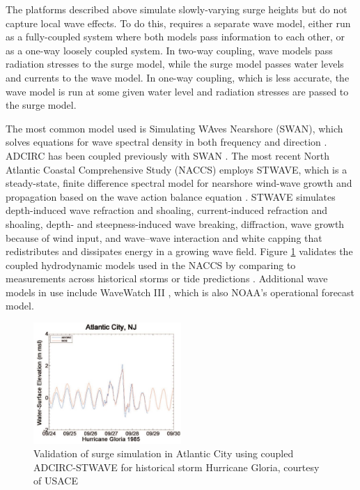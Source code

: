 The platforms described above simulate slowly-varying surge heights but do not capture local wave effects. To do this, requires a separate wave model, either run as a fully-coupled system where both models pass information to each other, or as a one-way loosely coupled system. In two-way coupling, wave models pass radiation stresses to the surge model, while the surge model passes water levels and currents to the wave model. In one-way coupling, which is less accurate, the wave model is run at some given water level and radiation stresses are passed to the surge model.

The most common model used is Simulating WAves Nearshore (SWAN), which solves equations for wave spectral density in both frequency and direction \citep{zijlema2010computation}. ADCIRC has been coupled previously with SWAN \citep{dietrich2011modeling,kennedy2012tropical}. The most recent North Atlantic Coastal Comprehensive Study (NACCS) \citep{usace2015north} employs STWAVE, which is a steady-state, finite difference spectral model for nearshore wind-wave growth and propagation based on the wave action balance equation \citep{smith2001stwave}. STWAVE simulates depth-induced wave refraction and shoaling, current-induced refraction and shoaling, depth- and steepness-induced wave breaking, diffraction, wave growth because of wind input, and wave–wave interaction and white capping that redistributes and dissipates energy in a growing wave field. Figure \ref{fig:surge_validation} validates the coupled hydrodynamic models used in the NACCS by comparing to measurements across historical storms or tide predictions \citep{nadal-caraballo2015north}. Additional wave models in use include WaveWatch III \citep{smith2018validation}, which is also NOAA’s operational forecast model. 

\begin{figure}[htb]
    \centering
    \includegraphics[width=0.5\textwidth, angle = 0]{Figures/surge_validation.png}
    \caption{Validation of surge simulation in Atlantic City using coupled ADCIRC-STWAVE for historical storm Hurricane Gloria, courtesy of USACE \citep{nadal-caraballo2015north}}
    \label{fig:surge_validation}
\end{figure}

